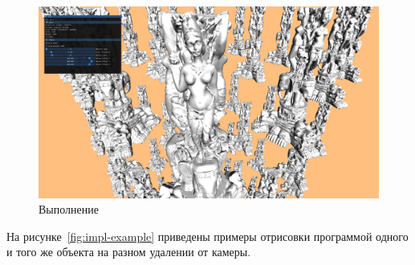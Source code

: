 \begin{figure}[ht]
    \includegraphics[width=\textwidth]{pics/impl2.png}
    \caption{Выполнение}
    \label{fig:execution-example}
\end{figure}

На рисунке~\ref{fig:impl-example} приведены примеры отрисовки программой одного и того же объекта на разном удалении от камеры.

